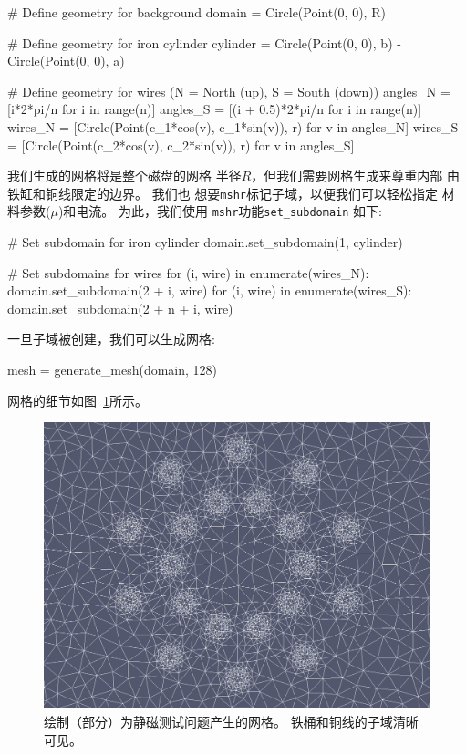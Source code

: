 \begin{python}
# Define geometry for background
domain = Circle(Point(0, 0), R)

# Define geometry for iron cylinder
cylinder = Circle(Point(0, 0), b) - Circle(Point(0, 0), a)

# Define geometry for wires (N = North (up), S = South (down))
angles_N = [i*2*pi/n for i in range(n)]
angles_S = [(i + 0.5)*2*pi/n for i in range(n)]
wires_N = [Circle(Point(c_1*cos(v), c_1*sin(v)), r) for v in angles_N]
wires_S = [Circle(Point(c_2*cos(v), c_2*sin(v)), r) for v in angles_S]
\end{python}

我们生成的网格将是整个磁盘的网格
半径$R$，但我们需要网格生成来尊重内部
由铁缸和铜线限定的边界。 我们也
想要\texttt{mshr}标记子域，以便我们可以轻松指定
材料参数($\mu$)和电流。 为此，我们使用
\texttt{mshr}功能\verb!set_subdomain! 如下:

\begin{python}
# Set subdomain for iron cylinder
domain.set_subdomain(1, cylinder)

# Set subdomains for wires
for (i, wire) in enumerate(wires_N):
    domain.set_subdomain(2 + i, wire)
for (i, wire) in enumerate(wires_S):
    domain.set_subdomain(2 + n + i, wire)
\end{python}
一旦子域被创建，我们可以生成网格:

\begin{python}
mesh = generate_mesh(domain, 128)
\end{python}
网格的细节如图~\ref{ftut1:fig:magnetostatics:mesh}所示。

\begin{figure}[!ht]  %
 \centerline{\includegraphics[width=0.95\linewidth]{fig/magnetostatics_mesh.png}}
 \caption{
 绘制（部分）为静磁测试问题产生的网格。 铁桶和铜线的子域清晰可见。\label{ftut1:fig:magnetostatics:mesh}
 }
\end{figure}

